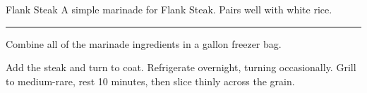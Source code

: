 \begin{recipe}{Flank Steak}{}{}
\freeform A simple marinade for Flank Steak. Pairs well with white rice.\\
\rule{\textwidth}{0.05pt}

Combine all of the marinade ingredients in a gallon freezer bag.

Add the steak and turn to coat. Refrigerate overnight, turning occasionally. Grill to medium-rare, rest 10 minutes, then slice thinly across the grain. 

\end{recipe}
